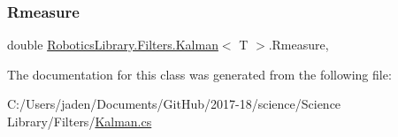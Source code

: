 \mbox{\label{class_robotics_library_1_1_filters_1_1_kalman_abb21b31283beac465da9fe1c947a52cf}} 
\subsubsection{\texorpdfstring{Rmeasure}{Rmeasure}}
{\footnotesize\ttfamily double \hyperlink{class_robotics_library_1_1_filters_1_1_kalman}{Robotics\+Library.\+Filters.\+Kalman}$<$ T $>$.Rmeasure\hspace{0.3cm}{\ttfamily [get]}, {\ttfamily [set]}}



The documentation for this class was generated from the following file\+:\begin{DoxyCompactItemize}
\item 
C\+:/\+Users/jaden/\+Documents/\+Git\+Hub/2017-\/18/science/\+Science Library/\+Filters/\hyperlink{_kalman_8cs}{Kalman.\+cs}\end{DoxyCompactItemize}
